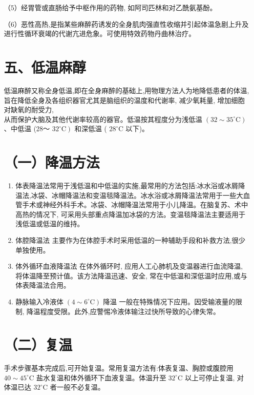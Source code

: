 \documentclass[10pt]{article}
\begin{document}
（5）经胃管或直肠给予中枢作用的药物, 如阿司匹林和对乙酰氨基酚。

（6）恶性高热,是指某些麻醉药诱发的全身肌肉强直性收缩并引起体温急剧上升及进行性循环衰竭的代谢亢进危象。可使用特效药物丹曲林治疗。

\section*{五、低温麻醇}
低温麻醉又称全身低温,即在全身麻醉的基础上,用物理方法人为地降低患者的体温,旨在降低全身及各组织器官尤其是脑组织的温度和代谢率, 减少氧耗量, 增加细胞对缺氧的耐受力,\\
从而保护大脑及其他代谢率较高的器官。低温按其程度分为浅低温 $\left(32 \sim 35^{\circ} \mathrm{C}\right)$ 、中低温 (28～ $\left.32^{\circ} \mathrm{C}\right)$ 和深低温 ( $28^{\circ} \mathrm{C}$ 以下)。

\section*{（一）降温方法}
\begin{enumerate}
  \item 体表降温法常用于浅低温和中低温的实施,最常用的方法包括:冰水浴或冰屑降温法,冰袋、冰帽降温法和变温毯降温法。冰水浴或冰屑降温法常用于一些大血管手术或神经外科手术。冰袋、冰帽降温法常用于小儿降温。在脑复苏、术中高热的情况下, 可采用头部重点降温加冰袋的方法。变温毯降温法主要适用于浅低温或低温的维持。

  \item 体腔降温法 主要作为在体腔手术时采用低温的一种辅助手段和补救方法,很少单独使用。

  \item 体外循环血液降温法 在体外循环时, 应用人工心肺机及变温器进行血流降温, 将体温降至预计值。该方法降温迅速、安全, 常在中低温和深低温时应用,或与体表降温法合用。

  \item 静脉输入冷液体 $\left(4 \sim 6^{\circ} \mathrm{C}\right)$ 降温 一般在特殊情况下应用。因受输液量的限制, 降温程度受限。此外,应警惕冷液体输注过快所导致的心律失常。

\end{enumerate}

\section*{（二）复温}
手术步骤基本完成后,可开始复温。常用复温方法有:体表复温、胸腔或腹腔用 $40 \sim 45^{\circ} \mathrm{C}$ 盐水复温和体外循环下血液复温。体温升至 $32^{\circ} \mathrm{C}$ 以上可停止复温, 对体温已达 $32^{\circ} \mathrm{C}$ 者一般不必复温。
\end{document}
